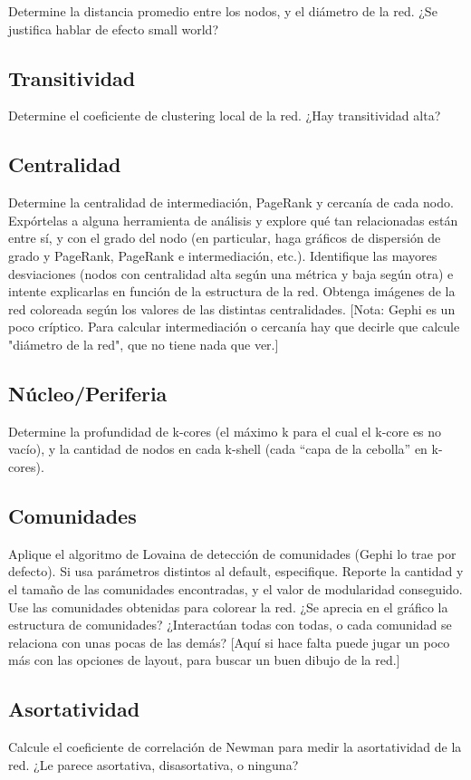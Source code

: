 \documentclass[12pt]{article}
\begin{document}
Determine la distancia promedio entre los nodos, y el diámetro de la red. ¿Se justifica hablar de efecto small world?

\subsection{Transitividad} 
Determine el coeficiente de clustering local de la red. ¿Hay transitividad alta?

\subsection{Centralidad}  
Determine la centralidad de intermediación, PageRank y cercanía de cada nodo. Expórtelas a alguna herramienta de análisis y explore qué tan relacionadas están entre sí, y con el grado del nodo (en particular, haga gráficos de dispersión de grado y PageRank, PageRank e intermediación, etc.). Identifique las mayores desviaciones (nodos con centralidad alta según una métrica y baja según otra) e intente explicarlas en función de la estructura de la red. Obtenga imágenes de la red coloreada según los valores de las distintas centralidades. [Nota: Gephi es un poco críptico. Para calcular intermediación o cercanía hay que decirle que calcule "diámetro de la red", que no tiene nada que ver.]

\subsection{Núcleo/Periferia}
Determine la profundidad de k-cores (el máximo k para el cual el k-core es no vacío), y la cantidad de nodos en cada k-shell (cada “capa de la cebolla” en k-cores).

\subsection{Comunidades} Aplique el algoritmo de Lovaina de detección de comunidades (Gephi lo trae por defecto). Si usa parámetros distintos al default, especifique. Reporte la cantidad y el tamaño de las comunidades encontradas, y el valor de modularidad conseguido. Use las comunidades obtenidas para colorear la red. ¿Se aprecia en el gráfico la estructura de comunidades? ¿Interactúan todas con todas, o cada comunidad se relaciona con unas pocas de las demás? [Aquí si hace falta puede jugar un poco más con las opciones de layout, para buscar un buen dibujo de la red.]

\subsection{Asortatividad}
Calcule el coeficiente de correlación de Newman para medir la asortatividad de la red. ¿Le parece asortativa, disasortativa, o ninguna?
\end{document}
